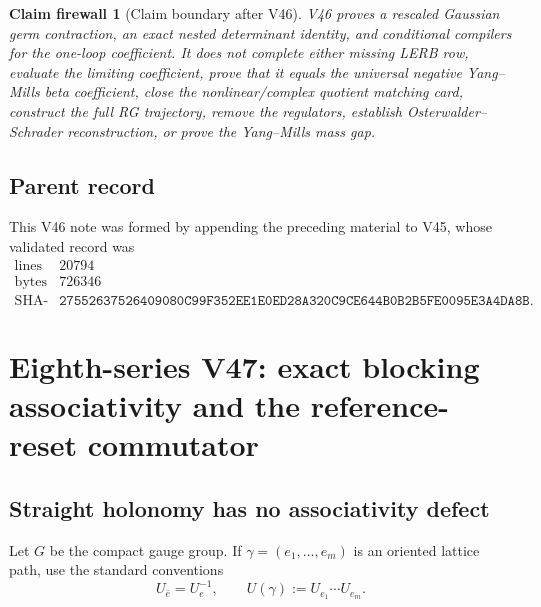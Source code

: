 \documentclass[11pt,oneside]{book}
\newtheorem{firewall}[theorem]{Claim firewall}
\theoremstyle{definition}
\theoremstyle{remark}
\begin{document}
\begin{firewall}[Claim boundary after V46]
\label{fire:e8v46-claim}
V46 proves a rescaled Gaussian germ contraction, an exact nested
determinant identity, and conditional compilers for the one-loop
coefficient.  It does not complete either missing LERB row,
evaluate the limiting coefficient, prove that it equals the
universal negative Yang--Mills beta coefficient, close the
nonlinear/complex quotient matching card, construct the full RG
trajectory, remove the regulators, establish
Osterwalder--Schrader reconstruction, or prove the Yang--Mills mass
gap.
\end{firewall}

\subsection{Parent record}

This V46 note was formed by appending the preceding material to V45,
whose validated record was
\[
\begin{array}{c|c}
\text{lines}&20794\\
\text{bytes}&726346\\
\text{SHA-256}&
\texttt{27552637526409080C99F352EE1E0ED28A320C9CE644B0B2B5FE0095E3A4DA8B}.
\end{array}
\]



\section{Eighth-series V47: exact blocking associativity and the
reference-reset commutator}
\label{sec:e8v47}

\subsection{Straight holonomy has no associativity defect}

Let \(G\) be the compact gauge group.  If
\(\gamma=(e_1,\ldots,e_m)\) is an oriented lattice path, use the
standard conventions
\[
 U_{\bar e}=U_e^{-1},\qquad
 U(\gamma):=U_{e_1}\cdots U_{e_m}.                             \tag{47.1}
\]
\end{document}
